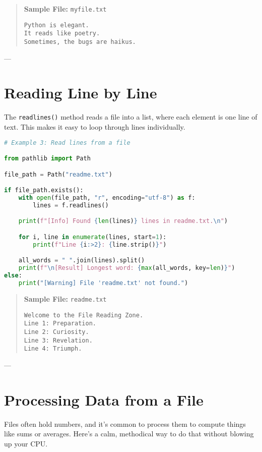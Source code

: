 \begin{quote}
\textbf{Sample File:} \texttt{myfile.txt}
\begin{verbatim}
Python is elegant.
It reads like poetry.
Sometimes, the bugs are haikus.
\end{verbatim}
\end{quote}

---

\section{Reading Line by Line}

The \texttt{readlines()} method reads a file into a list, where each element is one line of text.
This makes it easy to loop through lines individually.

\begin{lstlisting}[language=Python, caption={Reading all lines into a list.}]
# Example 3: Read lines from a file

from pathlib import Path

file_path = Path("readme.txt")

if file_path.exists():
    with open(file_path, "r", encoding="utf-8") as f:
        lines = f.readlines()

    print(f"[Info] Found {len(lines)} lines in readme.txt.\n")

    for i, line in enumerate(lines, start=1):
        print(f"Line {i:>2}: {line.strip()}")

    all_words = " ".join(lines).split()
    print(f"\n[Result] Longest word: {max(all_words, key=len)}")
else:
    print("[Warning] File 'readme.txt' not found.")
\end{lstlisting}

\begin{quote}
\textbf{Sample File:} \texttt{readme.txt}
\begin{verbatim}
Welcome to the File Reading Zone.
Line 1: Preparation.
Line 2: Curiosity.
Line 3: Revelation.
Line 4: Triumph.
\end{verbatim}
\end{quote}

---

\section{Processing Data from a File}

Files often hold numbers, and it’s common to process them to compute things like sums or averages.  
Here’s a calm, methodical way to do that without blowing up your CPU.

